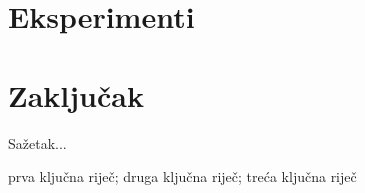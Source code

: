 \documentclass[diplomskirad]{fer}
\begin{document}
\chapter{Eksperimenti}
\label{pog:eksperimenti}


\chapter{Zaključak}
\label{pog:zakljucak}







\begin{sazetak}
  Sažetak...
\end{sazetak}

\begin{kljucnerijeci}
  prva ključna riječ; druga ključna riječ; treća ključna riječ
\end{kljucnerijeci}
\end{document}
